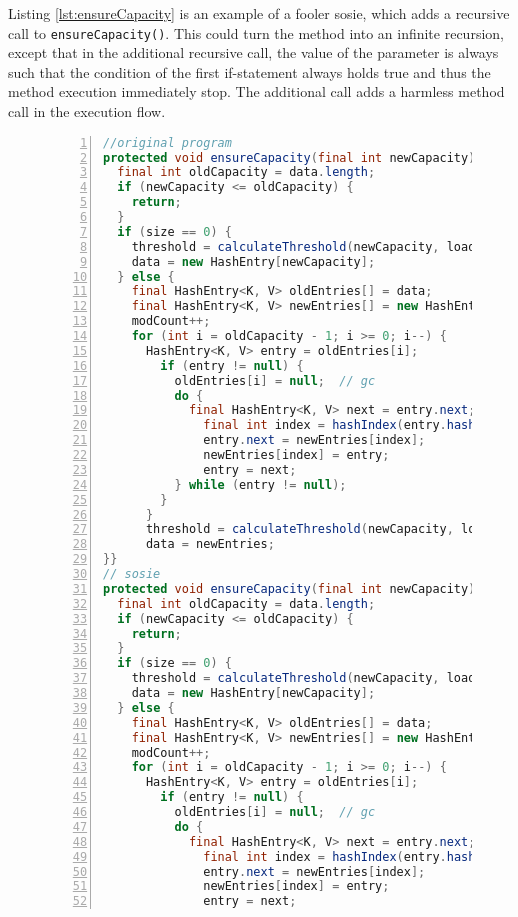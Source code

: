 Listing \ref{lst:ensureCapacity} is an example of a fooler sosie, which adds a recursive call to \texttt{ensureCapacity()}. 
This could turn the method into an infinite recursion, except that in the additional recursive call, the value of the parameter is always such that the condition of the first if-statement  always holds true and thus the method execution immediately stop. 
The additional call adds a harmless method call in the execution flow.

\begin{figure}[ht]
\begin{lstlisting}[caption={\texttt{ensureCapacity} in commons.collection},label={lst:ensureCapacity},language=java,numbers=left]
//original program
protected void ensureCapacity(final int newCapacity) {
  final int oldCapacity = data.length;
  if (newCapacity <= oldCapacity) {
    return;
  }
  if (size == 0) {
    threshold = calculateThreshold(newCapacity, loadFactor);
    data = new HashEntry[newCapacity];
  } else {
    final HashEntry<K, V> oldEntries[] = data;
    final HashEntry<K, V> newEntries[] = new HashEntry[newCapacity];
    modCount++;
    for (int i = oldCapacity - 1; i >= 0; i--) {
      HashEntry<K, V> entry = oldEntries[i];
        if (entry != null) {
          oldEntries[i] = null;  // gc
          do {
            final HashEntry<K, V> next = entry.next;
              final int index = hashIndex(entry.hashCode, newCapacity);
              entry.next = newEntries[index];
              newEntries[index] = entry;
              entry = next;
          } while (entry != null);
        }
      }
      threshold = calculateThreshold(newCapacity, loadFactor);
      data = newEntries;
}}
// sosie  
protected void ensureCapacity(final int newCapacity) {
  final int oldCapacity = data.length;
  if (newCapacity <= oldCapacity) {
    return;
  }
  if (size == 0) {
    threshold = calculateThreshold(newCapacity, loadFactor);
    data = new HashEntry[newCapacity];
  } else {
    final HashEntry<K, V> oldEntries[] = data;
    final HashEntry<K, V> newEntries[] = new HashEntry[newCapacity];
    modCount++;
    for (int i = oldCapacity - 1; i >= 0; i--) {
      HashEntry<K, V> entry = oldEntries[i];
        if (entry != null) {
          oldEntries[i] = null;  // gc
          do {
            final HashEntry<K, V> next = entry.next;
              final int index = hashIndex(entry.hashCode, newCapacity);
              entry.next = newEntries[index];
              newEntries[index] = entry;
              entry = next;

\end{lstlisting}
\end{figure}
